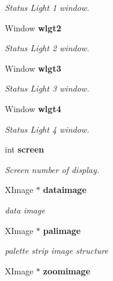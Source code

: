 \begin{CompactItemize}
\begin{CompactList}\small\item\em Status Light 1 window. \item\end{CompactList}\item 
Window {\bf wlgt2}\label{xtvutils_8c_a12}

\begin{CompactList}\small\item\em Status Light 2 window. \item\end{CompactList}\item 
Window {\bf wlgt3}\label{xtvutils_8c_a13}

\begin{CompactList}\small\item\em Status Light 3 window. \item\end{CompactList}\item 
Window {\bf wlgt4}\label{xtvutils_8c_a14}

\begin{CompactList}\small\item\em Status Light 4 window. \item\end{CompactList}\item 
int {\bf screen}\label{xtvutils_8c_a15}

\begin{CompactList}\small\item\em Screen number of display. \item\end{CompactList}\item 
XImage $\ast$ {\bf dataimage}\label{xtvutils_8c_a16}

\begin{CompactList}\small\item\em data image \item\end{CompactList}\item 
XImage $\ast$ {\bf palimage}\label{xtvutils_8c_a17}

\begin{CompactList}\small\item\em palette strip image structure \item\end{CompactList}\item 
XImage $\ast$ {\bf zoomimage}\label{xtvutils_8c_a18}


\end{CompactItemize}
